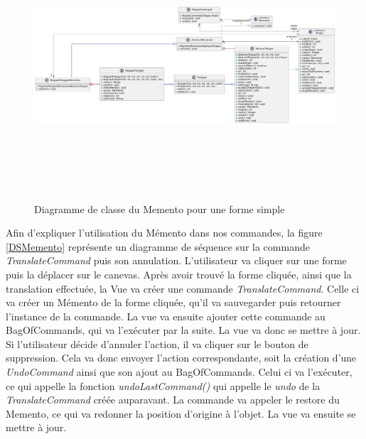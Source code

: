 \documentclass{article}
\begin{document}
\begin{figure}[h]
    \centering
    \includegraphics[width=\textwidth,height=10.0cm,keepaspectratio]{memento2.png}
    \caption{Diagramme de classe du Memento pour une forme simple}
    \label{MementoShape}
\end{figure}
\FloatBarrier

Afin d'expliquer l'utilisation du Mémento dans nos commandes, la figure \ref{DSMemento} représente un diagramme de séquence sur la commande \textit{TranslateCommand} puis son annulation.
L'utilisateur va cliquer sur une forme puis la déplacer sur le canevas. Après avoir trouvé la forme cliquée, ainsi que la translation effectuée,
la Vue va créer une commande \textit{TranslateCommand}. Celle ci va créer un Mémento de la forme cliquée, qu'il va sauvegarder puis retourner l'instance de la commande.
La vue va ensuite ajouter cette commande au BagOfCommands, qui va l'exécuter par la suite.
La vue va donc se mettre à jour.
Si l'utilisateur décide d'annuler l'action, il va cliquer sur le bouton de suppression. Cela va donc envoyer l'action correspondante, soit la création d'une \textit{UndoCommand}
ainsi que son ajout au BagOfCommands. Celui ci va l'exécuter, ce qui appelle la fonction \textit{undoLastCommand()} qui appelle le \textit{undo} de
la \textit{TranslateCommand} créée auparavant. La commande va appeler le restore du Memento, ce qui va redonner la position d'origine à l'objet.
La vue va ensuite se mettre à jour.
\end{document}
